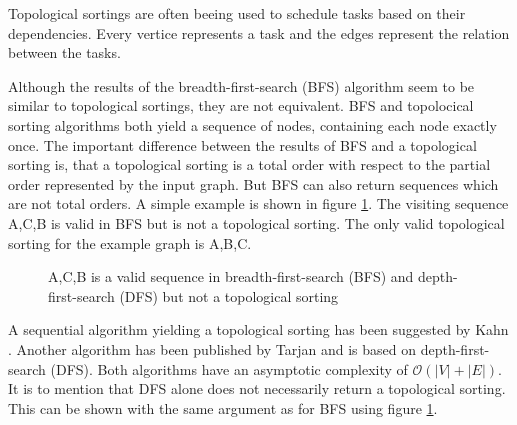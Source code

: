 \documentclass[letterpaper]{article}
\begin{document}
Topological sortings are often beeing used to schedule tasks based on their dependencies. Every vertice represents a task and the edges represent the relation between the tasks.

Although the results of the breadth-first-search (BFS) algorithm seem to be similar to topological sortings, they are not equivalent. BFS and topolocical sorting algorithms both yield a sequence of nodes, containing each node exactly once. The important difference between the results of BFS and a topological sorting is, that a topological sorting is a total order with respect to the partial order represented by the input graph. But BFS can also return sequences which are not total orders. A simple example is shown in figure \ref{fig:diff-bfs}. The visiting sequence A,C,B is valid in BFS but is not a topological sorting. The only valid topological sorting for the example graph is A,B,C.


\begin{figure}[!hbp]
\centering
 

\caption{A,C,B is a valid sequence in breadth-first-search (BFS) and depth-first-search (DFS) but not a topological sorting}
\label{fig:diff-bfs}
\end{figure}

A sequential algorithm yielding a topological sorting has been suggested by Kahn \cite{kahn1962topological}. Another algorithm has been published by Tarjan  \cite{tarjan1976edge} and is based on depth-first-search (DFS). Both algorithms have an asymptotic complexity of $\mathcal{O}(|V|+|E|)$. It is to mention that DFS alone does not necessarily return a topological sorting. This can be shown with the same argument as for BFS using figure \ref{fig:diff-bfs}.
\end{document}
